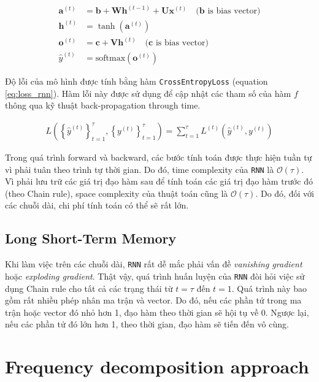 \begin{align}
    \mathbf{a}^{(t)} &= \mathbf{b} + \mathbf{W}\mathbf{h}^{(t-1)} + \mathbf{U}\mathbf{x}^{(t)}\quad \text{($\mathbf{b}$ is bias vector)}\\
    \mathbf{h}^{(t)} &= \tanh\left( \mathbf{a}^{(t)} \right)\\
    \mathbf{o}^{(t)} &= \mathbf{c} + \mathbf{V}\mathbf{h}^{(t)}\quad \text{($\mathbf{c}$ is bias vector)}\\
    \hat{y}^{(t)} &= \text{softmax}\left( \mathbf{o}^{(t)} \right)
\end{align}

Độ lỗi của mô hình được tính bằng hàm \verb|CrossEntropyLoss| (equation \ref{eq:loss_rnn}). Hàm lỗi này được sử dụng để cập nhật các tham số của hàm $f$ thông qua kỹ thuật back-propagation through time.

\begin{align}
    L\left( \left\{ \hat{y}^{(t)} \right\}_{t=1}^\tau, \left\{ y^{(t)} \right\}_{t=1}^\tau \right) = \sum_{t=1}^\tau{L^{(t)}\left( \hat{y}^{(t)}, y^{(t)} \right)}
    \label{eq:loss_rnn}
\end{align}

Trong quá trình forward và backward, các bước tính toán được thực hiện tuần tự vì phải tuân theo trình tự thời gian. Do đó, time complexity của \verb|RNN| là $\mathcal{O}(\tau)$. Vì phải lưu trữ các giá trị đạo hàm sau để tính toán các giá trị đạo hàm trước đó (theo Chain rule), space complexity của thuật toán cũng là $\mathcal{O}(\tau)$. Do đó, đối với các chuỗi dài, chi phí tính toán có thể sẽ rất lớn.

\subsection{Long Short-Term Memory}

Khi làm việc trên các chuỗi dài, \verb|RNN| rất dễ mắc phải vấn đề \textit{vanishing gradient} hoặc \textit{exploding gradient}. Thật vậy, quá trình huấn luyện của \verb|RNN| đòi hỏi việc sử dụng Chain rule cho tất cả các trạng thái từ $t=\tau$ đến $t=1$. Quá trình này bao gồm rất nhiều phép nhân ma trận và vector. Do đó, nếu các phần tử trong ma trận hoặc vector đó nhỏ hơn 1, đạo hàm theo thời gian sẽ hội tụ về 0. Ngược lại, nếu các phần tử đó lớn hơn 1, theo thời gian, đạo hàm sẽ tiến đến vô cùng.


\section{Frequency decomposition approach}

